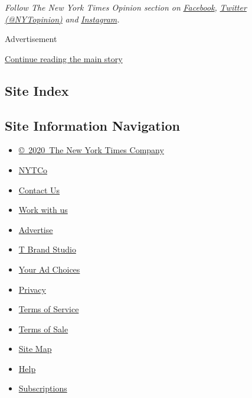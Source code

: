\emph{Follow The New York Times Opinion section on}
\href{https://www.facebookcorewwwi.onion/nytopinion}{\emph{Facebook}}\emph{,}
\href{http://twitter.com/NYTOpinion}{\emph{Twitter (@NYTopinion)}}
\emph{and}
\href{https://www.instagram.com/nytopinion/}{\emph{Instagram}}\emph{.}

Advertisement

\protect\hyperlink{after-bottom}{Continue reading the main story}

\hypertarget{site-index}{%
\subsection{Site Index}\label{site-index}}

\hypertarget{site-information-navigation}{%
\subsection{Site Information
Navigation}\label{site-information-navigation}}

\begin{itemize}
\tightlist
\item
  \href{https://help.nytimes3xbfgragh.onion/hc/en-us/articles/115014792127-Copyright-notice}{©~2020~The
  New York Times Company}
\end{itemize}

\begin{itemize}
\tightlist
\item
  \href{https://www.nytco.com/}{NYTCo}
\item
  \href{https://help.nytimes3xbfgragh.onion/hc/en-us/articles/115015385887-Contact-Us}{Contact
  Us}
\item
  \href{https://www.nytco.com/careers/}{Work with us}
\item
  \href{https://nytmediakit.com/}{Advertise}
\item
  \href{http://www.tbrandstudio.com/}{T Brand Studio}
\item
  \href{https://www.nytimes3xbfgragh.onion/privacy/cookie-policy\#how-do-i-manage-trackers}{Your
  Ad Choices}
\item
  \href{https://www.nytimes3xbfgragh.onion/privacy}{Privacy}
\item
  \href{https://help.nytimes3xbfgragh.onion/hc/en-us/articles/115014893428-Terms-of-service}{Terms
  of Service}
\item
  \href{https://help.nytimes3xbfgragh.onion/hc/en-us/articles/115014893968-Terms-of-sale}{Terms
  of Sale}
\item
  \href{https://spiderbites.nytimes3xbfgragh.onion}{Site Map}
\item
  \href{https://help.nytimes3xbfgragh.onion/hc/en-us}{Help}
\item
  \href{https://www.nytimes3xbfgragh.onion/subscription?campaignId=37WXW}{Subscriptions}
\end{itemize}
